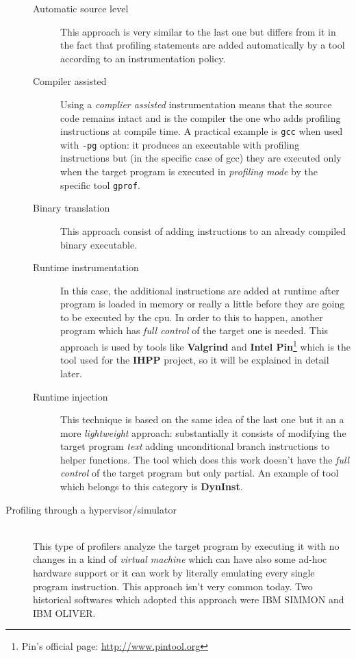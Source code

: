 \documentclass[a4paper,11pt]{report}
\begin{document}
\begin{description}
\begin{description}
\item[Automatic source level]
This approach is very similar to the last one but differs from it in the fact that profiling statements are added automatically by a tool according to an instrumentation policy.

\item[Compiler assisted]
Using a \emph{complier assisted} instrumentation means that the source code remains intact and is the compiler the one who adds profiling instructions at compile time. A practical example is \verb|gcc| when used with \verb|-pg| option: it produces an executable with profiling instructions but (in the specific case of gcc) they are executed only when the target program is executed in \emph{profiling mode} by the specific tool \verb|gprof|.

\item[Binary translation]
This approach consist of adding instructions to an already compiled binary executable.

\item[Runtime instrumentation]
In this case, the additional instructions are added at runtime after program is loaded in memory or really a little before 
they are going to be executed by the cpu. In order to this to happen, another program which has \emph{full control} of the target one is needed. This approach is used by tools like \textbf{Valgrind} and \textbf{Intel Pin}\footnote{Pin's official page: \url{http://www.pintool.org}} which is the tool used for the \textbf{IHPP} project, so it will be explained in detail later.

\item[Runtime injection]
This technique is based on the same idea of the last one but it an a more \emph{lightweight} approach: substantially it consists of modifying the target program \emph{text} adding unconditional branch instructions to helper functions. The tool which does this work doesn't have the \emph{full control} of the target program but only partial. An example of tool which belongs to this category is \textbf{DynInst}.

\end{description} 

\item[Profiling through a hypervisor/simulator] \hfill \\
This type of profilers analyze the target program by executing it with no changes in a kind of \emph{virtual machine} which can have also some ad-hoc hardware support or it can work by literally emulating every single program instruction. This approach isn't very common today. Two historical softwares which adopted this approach were IBM SIMMON and IBM OLIVER.

\end{description}
\end{document}
